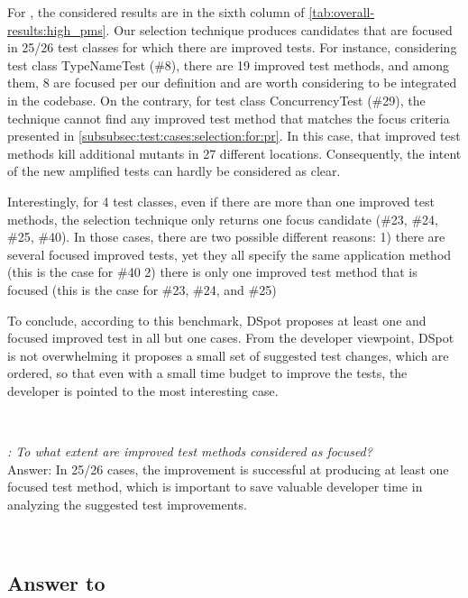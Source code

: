 \documentclass[table,xcdraw,smallextended]{svjour3}
\newcommand{\dspot}{DSpot\xspace}
\begin{document}
For \rqcandidates{}, the considered results are in the sixth column of \autoref{tab:overall-results:high_pms}. Our selection technique produces candidates that are focused in 25/26 test classes for which there are improved tests. 
For instance, considering test class TypeNameTest (\#8), there are 19 improved test methods, and among them, 8 are focused per our definition and are worth considering to be integrated in the codebase.
On the contrary, for test class ConcurrencyTest (\#29), the technique cannot find any improved test method that matches the focus criteria presented in \autoref{subsubsec:test:cases:selection:for:pr}. In this case, that improved test methods kill additional mutants in 27 different locations. Consequently, the intent of the new amplified tests can  hardly be considered as clear.

Interestingly, for 4 test classes, even if there are more than one improved test methods, the selection technique only  returns one focus candidate (\#23, \#24, \#25, \#40). 
In those cases, there are two possible different reasons:
1) there are several focused improved tests, yet they all specify the same application method (this is the case for \#40
2) there is only one improved test method that is focused (this is the case for \#23, \#24, and \#25)

To conclude, according to this benchmark, \dspot{} proposes at least one and focused improved test in all but one cases. From the developer viewpoint, \dspot is not overwhelming it proposes a small set of suggested test changes, which are ordered, so that even with a small time budget to improve the tests, the developer is pointed to the most interesting case.

~\\
\begin{mdframed}
\textit{\rqcandidates{}:  To what extent are improved test methods considered as focused?}\\
Answer: In 25/26 cases, the improvement is successful at producing at least one focused test method, which is important to save valuable developer time in analyzing the suggested test improvements.
\end{mdframed}
~\\



\subsection{Answer to \rqeffectiveness}
\end{document}
